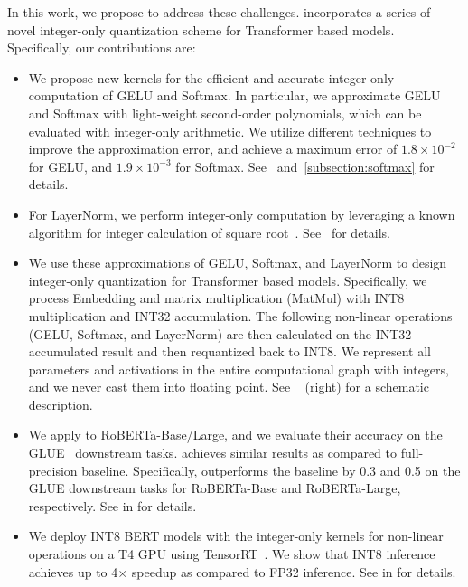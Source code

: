In this work, we propose \OURS to address these challenges. 
\OURS incorporates a series of novel integer-only quantization scheme for Transformer based models.
Specifically, our contributions are:
\vspace{-2mm}
\begin{itemize}[noitemsep, nolistsep, labelindent=0pt, leftmargin=*]
    \item 
    We propose new kernels for the efficient and accurate integer-only computation of GELU and Softmax.
    In particular, we approximate GELU and Softmax with light-weight second-order polynomials, which can
    be evaluated with integer-only arithmetic.
    We utilize different techniques to improve the approximation error, and achieve
    a  maximum error of $1.8 \times 10^{-2}$ for GELU, and $1.9 \times 10^{-3}$ for Softmax.
    See~ and~\ref{subsection:softmax} for details.
    
    \item 
    For LayerNorm, we perform integer-only computation by leveraging a known algorithm for integer calculation of square root~\cite{crandall2006prime}. 
    See~ for details.
    
    \item 
    We use these approximations of GELU, Softmax, and LayerNorm to design integer-only quantization for Transformer based models. 
    Specifically, we process Embedding and matrix multiplication (MatMul) with INT8 multiplication
    and INT32 accumulation. The following non-linear operations (GELU, Softmax, and LayerNorm)
    are then calculated on the INT32 accumulated result and then requantized back to INT8.
    We represent all parameters and activations in the entire computational graph with integers, and we never cast them into floating point. 
    See ~ (right) for a schematic description. 
    
    \item 
    We apply \OURS to RoBERTa-Base/Large, and we evaluate their accuracy on the GLUE~\cite{wang2018glue} downstream tasks. 
    \OURS achieves similar results as compared to full-precision baseline. Specifically, \OURS outperforms the baseline by 0.3 and 0.5 on the GLUE downstream tasks for RoBERTa-Base and RoBERTa-Large, respectively.
    See  in  for details.
    
    \item
    We deploy INT8 BERT models with the integer-only kernels for non-linear operations on a T4 GPU using TensorRT~\cite{tensorrt}.
    We show that INT8 inference achieves up to 4$\times$ speedup as compared to FP32 inference. 
    See  in  for details.
\end{itemize}
